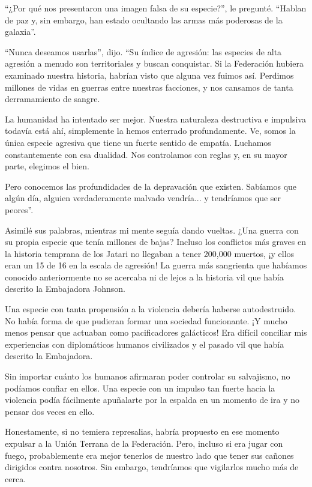 \documentclass[spanish,12pt,a4paper,oneside,titlepage]{book}
\begin{document}
    ``¿Por qué nos presentaron una imagen falsa de su especie?'', le pregunté. ``Hablan de paz y, sin embargo, han estado ocultando las armas más poderosas de la galaxia''.

    ``Nunca deseamos usarlas'', dijo. ``Su índice de agresión: las especies de alta agresión a menudo son territoriales y buscan conquistar. Si la Federación hubiera examinado nuestra historia, habrían visto que alguna vez fuimos así. Perdimos millones de vidas en guerras entre nuestras facciones, y nos cansamos de tanta derramamiento de sangre.

    La humanidad ha intentado ser mejor. Nuestra naturaleza destructiva e impulsiva todavía está ahí, simplemente la hemos enterrado profundamente. Ve, somos la única especie agresiva que tiene un fuerte sentido de empatía. Luchamos constantemente con esa dualidad. Nos controlamos con reglas y, en su mayor parte, elegimos el bien.

    Pero conocemos las profundidades de la depravación que existen. Sabíamos que algún día, alguien verdaderamente malvado vendría... y tendríamos que ser peores''.

    Asimilé sus palabras, mientras mi mente seguía dando vueltas. ¿Una guerra con su propia especie que tenía millones de bajas? Incluso los conflictos más graves en la historia temprana de los Jatari no llegaban a tener 200,000 muertos, ¡y ellos eran un 15 de 16 en la escala de agresión! La guerra más sangrienta que habíamos conocido anteriormente no se acercaba ni de lejos a la historia vil que había descrito la Embajadora Johnson.

    Una especie con tanta propensión a la violencia debería haberse autodestruido. No había forma de que pudieran formar una sociedad funcionante. ¡Y mucho menos pensar que actuaban como pacificadores galácticos! Era difícil conciliar mis experiencias con diplomáticos humanos civilizados y el pasado vil que había descrito la Embajadora.

    Sin importar cuánto los humanos afirmaran poder controlar su salvajismo, no podíamos confiar en ellos. Una especie con un impulso tan fuerte hacia la violencia podía fácilmente apuñalarte por la espalda en un momento de ira y no pensar dos veces en ello.

    Honestamente, si no temiera represalias, habría propuesto en ese momento expulsar a la Unión Terrana de la Federación. Pero, incluso si era jugar con fuego, probablemente era mejor tenerlos de nuestro lado que tener sus cañones dirigidos contra nosotros. Sin embargo, tendríamos que vigilarlos mucho más de cerca.
\end{document}
